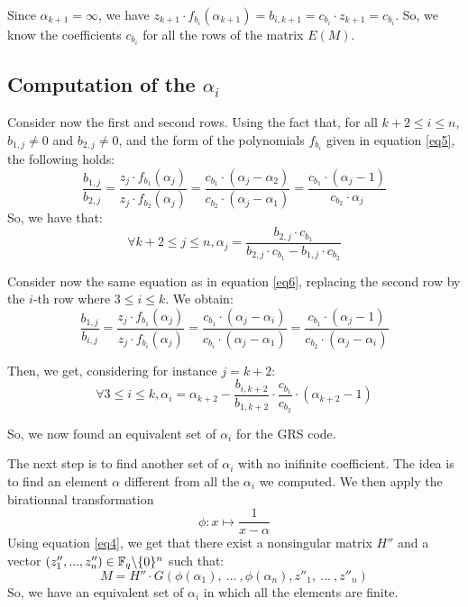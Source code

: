 \documentclass[a4paper]{article}
\begin{document}
Since $\alpha_{k+1} = \infty$, we have $z_{k+1}\cdot f_{b_i}(\alpha_{k+1}) = b_{i,k+1} = c_{b_i}\cdot z_{k+1} = c_{b_i}$.
So, we know the coefficients $c_{b_i}$ for all the rows of the matrix $E(M)$.

\subsection{Computation of the $\alpha_i$}
Consider now the first and second rows. Using the fact that, for all $k+2\leq i\leq n$, $b_{1,j}\neq 0$ and $b_{2,j}\neq 0$, and the form of the polynomials $f_{b_i}$ given in equation \eqref{eq5}, the following holds:
\begin{equation}
\frac{b_{1,j}}{b_{2,j}} = \frac{z_j\cdot f_{b_1}(\alpha_j)}{z_j\cdot f_{b_2}(\alpha_j)} = \frac{c_{b_1}\cdot (\alpha_j - \alpha_2)}{c_{b_2}\cdot (\alpha_j - \alpha_1)} = \frac{c_{b_1}\cdot (\alpha_j - 1)}{c_{b_2}\cdot \alpha_j}
\label{eq6}
\end{equation}
So, we have that:
\begin{equation}
\forall k+2\leq j\leq n, \alpha_j = \frac{b_{2,j}\cdot c_{b_1}}{b_{2,j}\cdot c_{b_1} - b_{1,j}\cdot c_{b_2}}
\label{eq7}
\end{equation}

Consider now the same equation as in equation \eqref{eq6}, replacing the second row by the $i$-th row where $3\leq i\leq k$. We obtain:
\begin{equation}
\frac{b_{1,j}}{b_{i,j}} = \frac{z_j\cdot f_{b_1}(\alpha_j)}{z_j\cdot f_{b_i}(\alpha_j)} = \frac{c_{b_1}\cdot (\alpha_j - \alpha_i)}{c_{b_i}\cdot (\alpha_j - \alpha_1)} = \frac{c_{b_1}\cdot (\alpha_j - 1)}{c_{b_2}\cdot (\alpha_j - \alpha_i)}
\label{eq8}
\end{equation}

Then, we get, considering for instance $j=k+2$:
\begin{equation}
\forall 3\leq i\leq k, \alpha_i = \alpha_{k+2} - \frac{b_{i,k+2}}{b_{1,k+2}}\cdot \frac{c_{b_1}}{c_{b_2}}\cdot (\alpha_{k+2}-1)
\label{eq9}
\end{equation}

So, we now found an equivalent set of $\alpha_i$ for the GRS code.

The next step is to find another set of $\alpha_i$ with no inifinite coefficient. The idea is to find an element $\alpha$ different from all the $\alpha_i$ we computed.
We then apply the birationnal transformation
$$ \phi : x \mapsto \frac{1}{x - \alpha}$$
Using equation \eqref{eq4}, we get that there exist a nonsingular matrix $H''$ and a vector $(z''_1,... ,z''_n) \in \mathbb{F}_q\backslash\{0\}^{n}$ such that:
$$M = H''\cdot G(\phi(\alpha_1), \ ... \ , \phi(\alpha_n), z''_1, \ ... \ , z''_n)$$
So, we have an equivalent set of $\alpha_i$ in which all the elements are finite.
\end{document}
